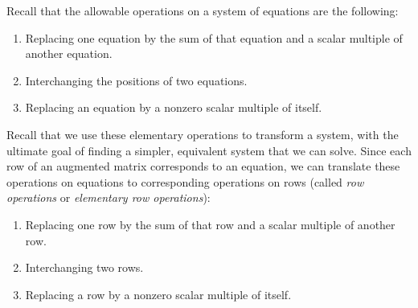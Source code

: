 Recall that the allowable operations on a system of equations are the following:
\begin{enumerate}
\item Replacing one equation by the sum of that equation and a scalar multiple of another equation.
\item Interchanging the positions of two equations.
\item Replacing an equation by a nonzero scalar multiple of itself.
\end{enumerate}
Recall that we use these elementary operations to transform a system, with the ultimate goal of finding a simpler, equivalent system that we can solve. Since each row of an augmented matrix corresponds to an equation, we can translate these operations on equations to corresponding operations on rows (called \emph{row operations} or \emph{elementary row operations}):

\begin{enumerate}
\item Replacing one row by the sum of that row and a scalar multiple of another row.
\item Interchanging two rows.
\item Replacing a row by a nonzero scalar multiple of itself.
\end{enumerate}



